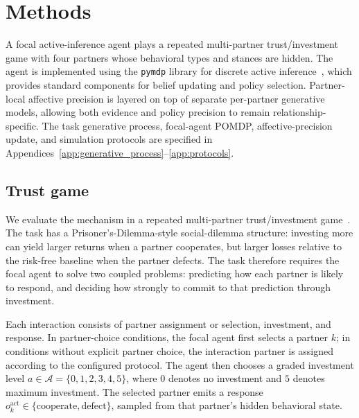 \section{Methods}
\label{sec:methods}

A focal active-inference agent plays a repeated multi-partner trust/investment game with four partners whose behavioral types and stances are hidden. The agent is implemented using the \texttt{pymdp} library for discrete active inference~\cite{DaCosta2020DiscreteSynthesis,Heins2022Pymdp}, which provides standard components for belief updating and policy selection. Partner-local affective precision is layered on top of separate per-partner generative models, allowing both evidence and policy precision to remain relationship-specific. The task generative process, focal-agent POMDP, affective-precision update, and simulation protocols are specified in Appendices~\ref{app:generative_process}--\ref{app:protocols}.

\subsection{Trust game}
\label{sec:trust_game}

We evaluate the mechanism in a repeated multi-partner trust/investment game~\cite{Berg1995Trust}. The task has a Prisoner's-Dilemma-style social-dilemma structure: investing more can yield larger returns when a partner cooperates, but larger losses relative to the risk-free baseline when the partner defects. The task therefore requires the focal agent to solve two coupled problems: predicting how each partner is likely to respond, and deciding how strongly to commit to that prediction through investment.

Each interaction consists of partner assignment or selection, investment, and response. In partner-choice conditions, the focal agent first selects a partner \(k\); in conditions without explicit partner choice, the interaction partner is assigned according to the configured protocol. The agent then chooses a graded investment level \(a \in \mathcal{A}=\{0,1,2,3,4,5\}\), where \(0\) denotes no investment and \(5\) denotes maximum investment. The selected partner emits a response \(o_k^{\mathrm{act}} \in \{\mathrm{cooperate},\mathrm{defect}\}\), sampled from that partner's hidden behavioral state.

